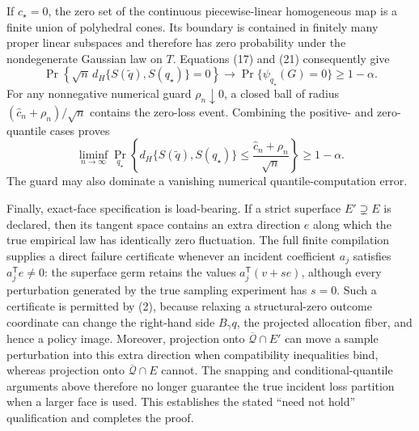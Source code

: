 If \(c_\star=0\), the zero set of the continuous piecewise-linear homogeneous map is a finite union of polyhedral cones.  Its boundary is contained in finitely many proper linear subspaces and therefore has zero probability under the nondegenerate Gaussian law on \(T\).  Equations (17) and (21) consequently give
\[
 \Pr\!\left\{\sqrt n\,d_H\{S(\widetilde q),S(q_\star)\}=0\right\}
 \longrightarrow \Pr\{\psi_{q_\star}(G)=0\}\geq1-\alpha.
\tag{24}
\]
For any nonnegative numerical guard \(\rho_n\downarrow0\), a closed ball of radius \((\widehat c_n+\rho_n)/\sqrt n\) contains the zero-loss event.  Combining the positive- and zero-quantile cases proves
\[
 \liminf_{n\to\infty}\Pr_{q_\star}\!\left\{
 d_H\{S(\widetilde q),S(q_\star)\}
 \leq\frac{\widehat c_n+\rho_n}{\sqrt n}
 \right\}\geq1-\alpha.
\tag{25}
\]
The guard may also dominate a vanishing numerical quantile-computation error.

Finally, exact-face specification is load-bearing.  If a strict superface \(E'\supsetneq E\) is declared, then its tangent space contains an extra direction \(e\) along which the true empirical law has identically zero fluctuation.  The full finite compilation supplies a direct failure certificate whenever an incident coefficient \(a_j\) satisfies \(a_j^{\mathsf T}e\neq0\): the superface germ retains the values \(a_j^{\mathsf T}(v+se)\), although every perturbation generated by the true sampling experiment has \(s=0\).  Such a certificate is permitted by (2), because relaxing a structural-zero outcome coordinate can change the right-hand side \(B_\gamma q\), the projected allocation fiber, and hence a policy image.  Moreover, projection onto \(\overline{\mathcal Q}\cap E'\) can move a sample perturbation into this extra direction when compatibility inequalities bind, whereas projection onto \(\overline{\mathcal Q}\cap E\) cannot.  The snapping and conditional-quantile arguments above therefore no longer guarantee the true incident loss partition when a larger face is used.  This establishes the stated ``need not hold'' qualification and completes the proof.
